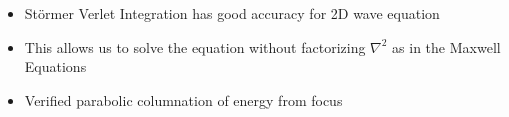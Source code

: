 \begin{itemize}
  \item St\"ormer Verlet Integration has good accuracy for 2D wave equation
  \item This allows us to solve the equation without factorizing $\nabla^2$ as
  in the Maxwell Equations \cite{fnc-driscoll}
  \item Verified parabolic columnation of energy from focus
\end{itemize}

